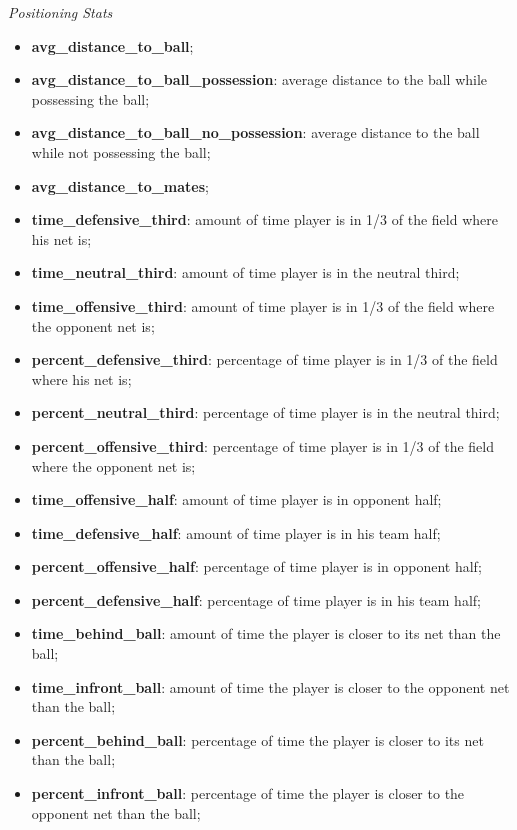 \begin{center}
    \textit{Positioning Stats}
\end{center}
\begin{itemize}
    \item \textbf{avg\_distance\_to\_ball};
    \item \textbf{avg\_distance\_to\_ball\_possession}: average distance to the ball while possessing the ball;
    \item \textbf{avg\_distance\_to\_ball\_no\_possession}: average distance to the ball while not possessing the ball;
    \item \textbf{avg\_distance\_to\_mates};
    \item \textbf{time\_defensive\_third}: amount of time player is in 1/3 of the field where his net is;
    \item \textbf{time\_neutral\_third}: amount of time player is in the neutral third;
    \item \textbf{time\_offensive\_third}: amount of time player is in 1/3 of the field where the opponent net is;
    \item \textbf{percent\_defensive\_third}: percentage of time player is in 1/3 of the field where his net is;
    \item \textbf{percent\_neutral\_third}: percentage of time player is in the neutral third;
    \item \textbf{percent\_offensive\_third}: percentage of time player is in 1/3 of the field where the opponent net is;
    \item \textbf{time\_offensive\_half}: amount of time player is in opponent half;
    \item \textbf{time\_defensive\_half}: amount of time player is in his team half;
    \item \textbf{percent\_offensive\_half}: percentage of time player is in opponent half;
    \item \textbf{percent\_defensive\_half}: percentage of time player is in his team half;
    \item \textbf{time\_behind\_ball}: amount of time the player is closer to its net than the ball;
    \item \textbf{time\_infront\_ball}: amount of time the player is closer to the opponent net than the ball;
    \item \textbf{percent\_behind\_ball}: percentage of time the player is closer to its net than the ball;
    \item \textbf{percent\_infront\_ball}: percentage of time the player is closer to the opponent net than the ball;

\end{itemize}
